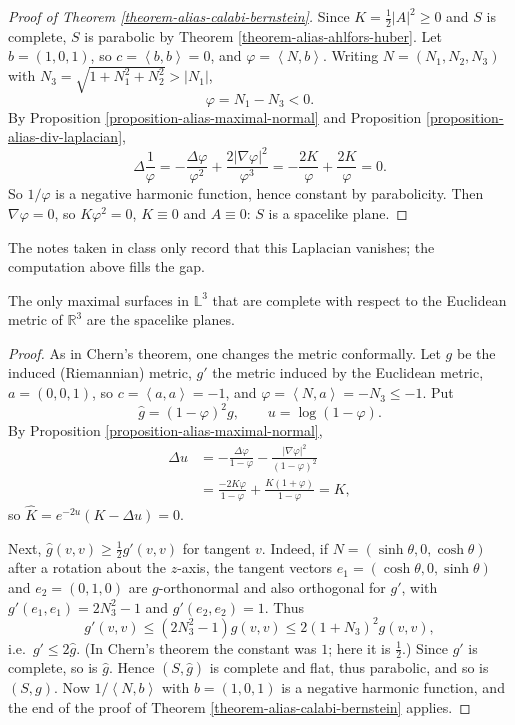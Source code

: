 \begin{proof}[Proof of Theorem
\ref{theorem-alias-calabi-bernstein}]
Since $K=\frac{1}{2}|A|^2\geq 0$ and $S$
is complete, $S$ is parabolic by Theorem
\ref{theorem-alias-ahlfors-huber}. Let
$b=(1,0,1)$, so $c=\left\langle{} b,b
\right\rangle{}=0$, and
$\varphi=\left\langle{} N,b
\right\rangle{}$. Writing
$N=(N_1,N_2,N_3)$ with
$N_3=\sqrt{1+N_1^2+N_2^2}>|N_1|$,
$$
\varphi=N_1-N_3<0.
$$
By Proposition
\ref{proposition-alias-maximal-normal}
and Proposition
\ref{proposition-alias-div-laplacian},
$$
\Delta\frac{1}{\varphi}
=-\frac{\Delta\varphi}{\varphi^2}
+\frac{2|\nabla\varphi|^2}{\varphi^3}
=-\frac{2K}{\varphi}
+\frac{2K}{\varphi}=0.
$$
So $1/\varphi$ is a negative harmonic
function, hence constant by parabolicity.
Then $\nabla\varphi=0$, so
$K\varphi^2=0$, $K\equiv 0$ and
$A\equiv 0$: $S$ is a spacelike plane.
\end{proof}

The notes taken in class only record
that this Laplacian vanishes; the
computation above fills the gap.

\begin{theorem}
\label{theorem-alias-maximal-euclid-complete}
The only maximal surfaces in
$\mathbb{L}^3$ that are complete with
respect to the Euclidean metric of
$\mathbb{R}^3$ are the spacelike planes.
\end{theorem}

\begin{proof}
As in Chern's theorem, one changes the
metric conformally. Let $g$ be the
induced (Riemannian) metric, $g'$ the
metric induced by the Euclidean metric,
$a=(0,0,1)$, so $c=\left\langle{} a,a
\right\rangle{}=-1$, and
$\varphi=\left\langle{} N,a
\right\rangle{}=-N_3\leq -1$. Put
$$
\hat{g}=(1-\varphi)^2g,
\qquad
u=\log(1-\varphi).
$$
By Proposition
\ref{proposition-alias-maximal-normal},
$$
\begin{aligned}
\Delta u
&=-\frac{\Delta\varphi}{1-\varphi}
-\frac{|\nabla\varphi|^2}
{(1-\varphi)^2}\\
&=\frac{-2K\varphi}{1-\varphi}
+\frac{K(1+\varphi)}{1-\varphi}
=K,
\end{aligned}
$$
so $\hat{K}=e^{-2u}(K-\Delta u)=0$.

Next, $\hat{g}(v,v)\geq\frac{1}{2}
g'(v,v)$ for tangent $v$. Indeed, if
$N=(\sinh\theta,0,\cosh\theta)$ after a
rotation about the $z$-axis, the tangent
vectors $e_1=(\cosh\theta,0,\sinh\theta)$
and $e_2=(0,1,0)$ are $g$-orthonormal and
also orthogonal for $g'$, with
$g'(e_1,e_1)=2N_3^2-1$ and
$g'(e_2,e_2)=1$. Thus
$$
g'(v,v)\leq(2N_3^2-1)g(v,v)
\leq 2(1+N_3)^2g(v,v),
$$
i.e.\ $g'\leq 2\hat{g}$. (In Chern's
theorem the constant was $1$; here it is
$\frac{1}{2}$.) Since $g'$ is complete,
so is $\hat{g}$. Hence $(S,\hat{g})$ is
complete and flat, thus parabolic, and so
is $(S,g)$. Now $1/\left\langle{} N,b
\right\rangle{}$ with $b=(1,0,1)$ is a
negative harmonic function, and the end of
the proof of Theorem
\ref{theorem-alias-calabi-bernstein}
applies.
\end{proof}

